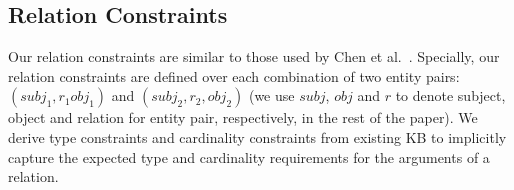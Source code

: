

\subsection{Relation Constraints}
\label{sec:constraints}



Our relation constraints are similar to those used by  Chen et al.~.
Specially,
our relation constraints are defined over each combination of two entity pairs: $(subj_1, r_1 obj_1)$ and $(subj_2,  r_2, obj_2)$
(we use $subj$, $obj$ and $r$ to denote subject, object and relation for entity pair, respectively, in the rest of the paper).
We derive type constraints and cardinality constraints from existing KB to implicitly capture the expected type and cardinality requirements for the arguments of a relation.
